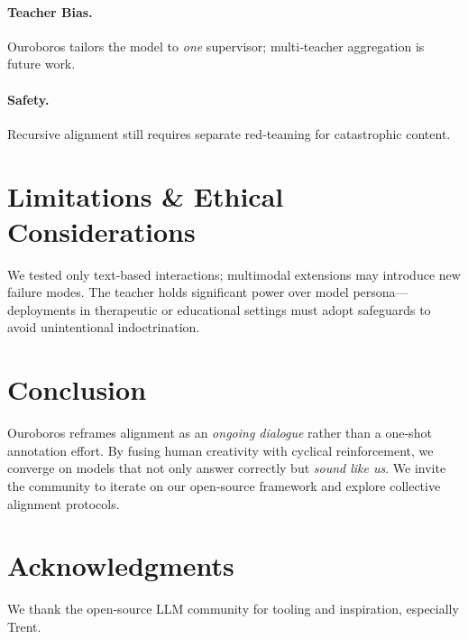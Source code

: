 \documentclass[11pt]{article}
\begin{document}
\paragraph{Teacher Bias.} Ouroboros tailors the model to \emph{one} supervisor; multi‑teacher aggregation is future work.%
\paragraph{Safety.} Recursive alignment still requires separate red‑teaming for catastrophic content.

\section{Limitations \& Ethical Considerations}
We tested only text‑based interactions; multimodal extensions may introduce new failure modes.  The teacher holds significant power over model persona---deployments in therapeutic or educational settings must adopt safeguards to avoid unintentional indoctrination.

\section{Conclusion}
Ouroboros reframes alignment as an \emph{ongoing dialogue} rather than a one‑shot annotation effort.  By fusing human creativity with cyclical reinforcement, we converge on models that not only answer correctly but \emph{sound like us}.  We invite the community to iterate on our open‑source framework and explore collective alignment protocols.

\section*{Acknowledgments}
We thank the open‑source LLM community for tooling and inspiration, especially Trent.
\end{document}
